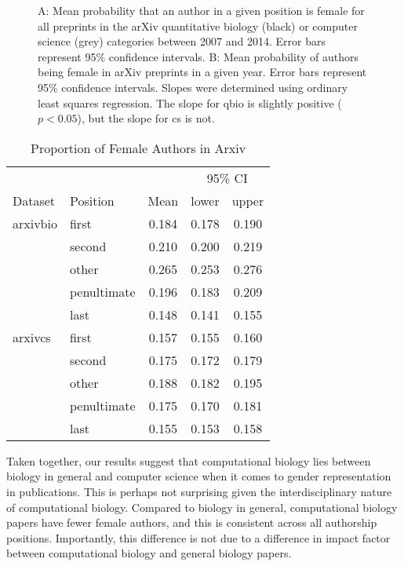 \documentclass[10pt,letterpaper]{article}
\begin{document}
\begin{flushleft}
\begin{figure}[!h]
  \caption{
  A: Mean probability that an author in a given position is female for all preprints in the arXiv quantitative biology (black) or computer science (grey) categories between 2007 and 2014. Error bars represent 95\% confidence intervals. B: Mean probability of authors being female in arXiv preprints in a given year. Error bars represent 95\% confidence intervals. Slopes were determined using ordinary least squares regression. The slope for q\-bio is slightly positive ($p < 0.05$), but the slope for cs is not.}
  \label{fig3}
\end{figure}

\begin{table}[]
\centering
\caption{Proportion of Female Authors in Arxiv}
\label{Table 3}
\begin{tabular}{llccc}
\toprule
        &                  &       & \multicolumn{2}{c}{95\% CI} \\
\cmidrule(r){4-5}
Dataset      & Position    & Mean  & lower        & upper        \\
\midrule
arxivbio     & first       & 0.184 & 0.178        & 0.190        \\
             & second      & 0.210 & 0.200        & 0.219        \\
             & other       & 0.265 & 0.253        & 0.276        \\
             & penultimate & 0.196 & 0.183        & 0.209        \\
             & last        & 0.148 & 0.141        & 0.155        \\
arxivcs      & first       & 0.157 & 0.155        & 0.160        \\
             & second      & 0.175 & 0.172        & 0.179        \\
             & other       & 0.188 & 0.182        & 0.195        \\
             & penultimate & 0.175 & 0.170        & 0.181        \\
             & last        & 0.155 & 0.153        & 0.158        \\
\bottomrule
\end{tabular}
\end{table}

Taken together, our results suggest that computational biology lies between biology in general and computer science when it comes to gender representation in publications. This is perhaps not surprising given the interdisciplinary nature of computational biology. Compared to biology in general, computational biology papers have fewer female authors, and this is consistent across all authorship positions. Importantly, this difference is not due to a difference in impact factor between computational biology and general biology papers.


\end{flushleft}
\end{document}
